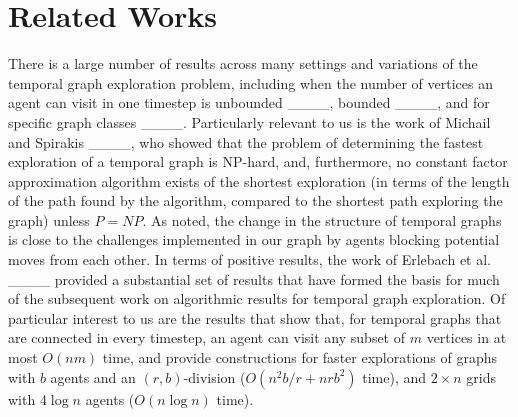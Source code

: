 \section{Related Works}
There is a large number of results across many settings and variations of the temporal graph exploration problem, including when the number of vertices an agent can visit in one timestep is unbounded ____, bounded ____, and for specific graph classes ____.
Particularly relevant to us is the work of Michail and Spirakis ____, who showed that the problem of determining the fastest exploration of a temporal graph is NP-hard, and, furthermore, no constant factor approximation algorithm exists of the shortest exploration (in terms of the length of the path found by the algorithm, compared to the shortest path exploring the graph) unless $P = NP$. As noted, the change in the structure of temporal graphs is close to the challenges implemented in our graph by agents blocking potential moves from each other.
In terms of positive results, the work of Erlebach et al. ____ provided a substantial set of results that have formed the basis for much of the subsequent work on algorithmic results for temporal graph exploration. Of particular interest to us are the results that show that, for temporal graphs that are connected in every timestep, an agent can visit any subset of $m$ vertices in at most $O(n m)$ time, and provide constructions for faster explorations of graphs with $b$ agents and an $(r, b)$-division ($O(n^2 b / r + n r b^2)$ time), and $2 \times n$ grids with $4 \log n$ agents ($O(n \log n)$ time).